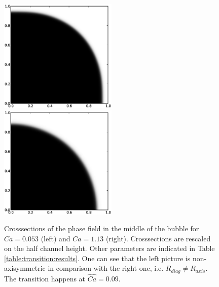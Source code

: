 \documentclass{article}
\begin{document}
\begin{figure}[ht]
\includegraphics[width=0.5\textwidth]{Figures/phase_crossection_ca5.eps}
\includegraphics[width=0.5\textwidth]{Figures/phase_crossection_ca13.eps}\\
\caption{Crosssections of the phase field in the middle of the bubble for $Ca=0.053$
(left) and $Ca=1.13$ (right). Crosssections are rescaled on the half channel height. Other
parameters are indicated in Table \ref{table:transition:results}. One can see that the left picture
is non-axisymmetric in comparison
with the right one, i.e. $R_{diag}\neq R_{axis}$. The transition happens at
$\widehat{Ca}=0.09$.\label{fig:crosssections:sym}}
\end{figure}
\end{document}
